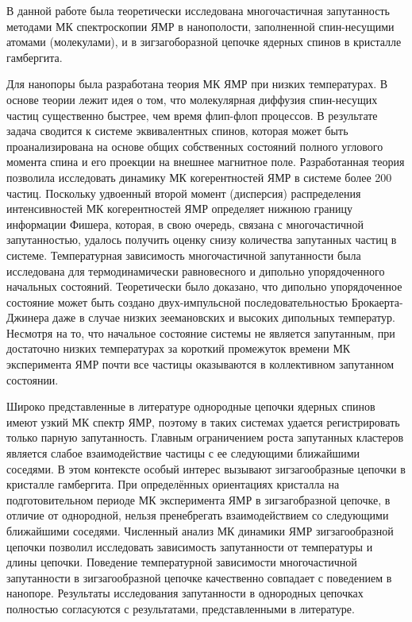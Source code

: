 В данной работе была теоретически исследована многочастичная запутанность методами МК спектроскопии ЯМР в нанополости,
заполненной спин-несущими атомами (молекулами),
и в зигзагоборазной цепочке ядерных спинов в кристалле гамбергита.

Для нанопоры была разработана теория МК ЯМР при низких температурах.
В основе теории лежит идея о том, что молекулярная диффузия спин-несущих частиц существенно быстрее,
чем время флип-флоп процессов.
В результате задача сводится к системе эквивалентных спинов,
которая может быть проанализирована на основе общих собственных состояний полного углового момента спина и его проекции на внешнее магнитное поле.
Разработанная теория позволила исследовать динамику МК когерентностей ЯМР в системе более 200 частиц.
Поскольку удвоенный второй момент (дисперсия) распределения интенсивностей МК когерентностей ЯМР определяет нижнюю границу информации Фишера,
которая, в свою очередь, связана с многочастичной запутанностью,
удалось получить оценку снизу количества запутанных частиц в системе.
Температурная зависимость многочастичной запутанности была исследована для термодинамически равновесного  и дипольно упорядоченного
начальных состояний.
Теоретически было доказано,
что дипольно упорядоченное состояние может быть создано двух-импульсной последовательностью Брокаерта-Джинера
даже в случае низких зеемановских и высоких дипольных температур.
Несмотря на то, что начальное состояние системы не является запутанным,
при достаточно низких температурах за короткий промежуток времени МК эксперимента ЯМР почти все частицы оказываются в коллективном запутанном состоянии.

Широко представленные в литературе однородные цепочки ядерных спинов имеют узкий МК спектр ЯМР,
поэтому в таких системах удается регистрировать только парную запутанность.
Главным ограничением роста запутанных кластеров является слабое взаимодействие частицы с ее следующими ближайшими соседями.
В этом контексте особый интерес вызывают зигзагообразные цепочки в кристалле гамбергита.
При определённых ориентациях кристалла на подготовительном периоде МК эксперимента ЯМР в зигзагобразной цепочке,
в отличие от однородной, 
нельзя пренебрегать взаимодействием со следующими ближайшими соседями. 
Численный анализ МК динамики ЯМР зигзагообразной цепочки позволил
исследовать зависимость запутанности от температуры и длины цепочки.
Поведение температурной зависимости многочастичной запутанности в зигзагообразной цепочке качественно совпадает с поведением в нанопоре.
Результаты исследования запутанности в однородных цепочках полностью согласуются с результатами, представленными в литературе.

